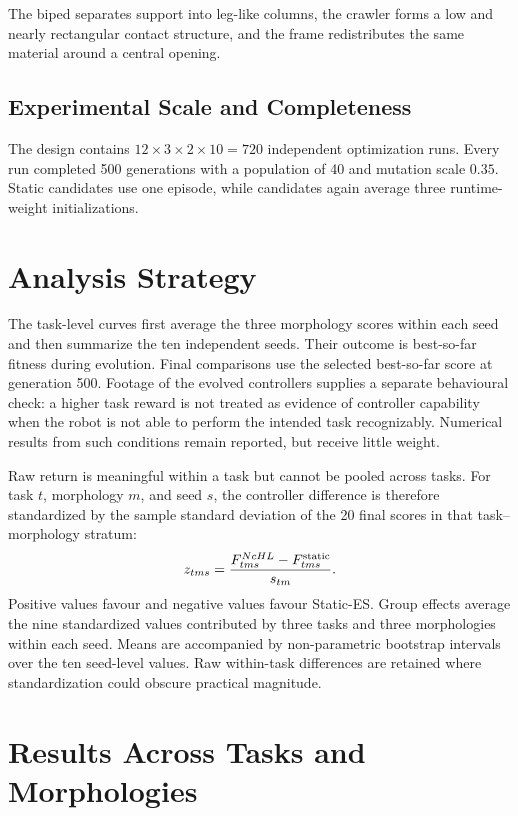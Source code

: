 The biped separates support into leg-like columns, the crawler forms a low and nearly rectangular contact structure, and the frame redistributes the same material around a central opening. 

\subsection{Experimental Scale and Completeness}

The design contains $12\times3\times2\times10=720$ independent optimization runs. Every run completed 500 generations with a population of 40 and mutation scale $0.35$. Static candidates use one episode, while \nchl{} candidates again average three runtime-weight initializations.

\section{Analysis Strategy}
\label{sec:extended-analysis}

The task-level curves first average the three morphology scores within each seed and then summarize the ten independent seeds. Their outcome is best-so-far fitness during evolution. Final comparisons use the selected best-so-far score at generation 500. Footage of the evolved controllers supplies a separate behavioural check: a higher task reward is not treated as evidence of controller capability when the robot is not able to perform the intended task recognizably. Numerical results from such conditions remain reported, but receive little weight.

Raw return is meaningful within a task but cannot be pooled across tasks. For task $t$, morphology $m$, and seed $s$, the controller difference is therefore standardized by the sample standard deviation of the 20 final scores in that task--morphology stratum:
\begin{equation}
  z_{tms}=
  \frac{F^{NcHL}_{tms}-F^{\mathrm{static}}_{tms}}{s_{tm}}.
  \label{eq:extended-standardized-effect}
\end{equation}
Positive values favour \nchlcontroller{} and negative values favour Static-ES. Group effects average the nine standardized values contributed by three tasks and three morphologies within each seed. Means are accompanied by non-parametric bootstrap intervals over the ten seed-level values. Raw within-task differences are retained where standardization could obscure practical magnitude.

\section{Results Across Tasks and Morphologies}
\label{sec:extended-results}

